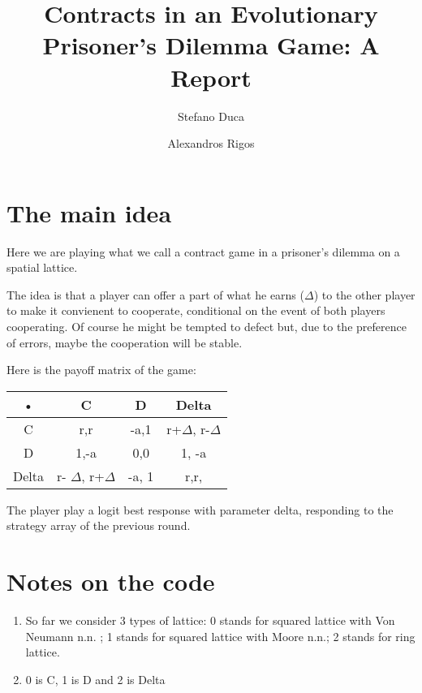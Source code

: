\documentclass{article}
\author{Stefano Duca \and Alexandros Rigos}
\title{Contracts in an Evolutionary Prisoner's Dilemma Game: A Report}
\begin{document}
\maketitle

\section{The main idea}
Here we are playing what we call a contract game in a prisoner's dilemma on a spatial lattice.

The idea is that a player can offer a part of what he earns ($\Delta$) to the other player to make it convienent to cooperate, conditional on the event of both players cooperating. Of course he might be tempted to defect but, due to the preference of errors, maybe the cooperation will be stable.

Here is the payoff matrix of the game:
\begin{center}
\begin{tabular}{|c|c|c|c|}
\hline 
• & C & D & Delta \\ 
\hline 
C & r,r & -a,1 & r+$\Delta$, r-$\Delta$ \\ 
\hline 
D & 1,-a & 0,0 & 1, -a \\ 
\hline 
Delta & r- $\Delta$, r+$\Delta$ & -a, 1 & r,r, \\ 
\hline 
\end{tabular} 
\end{center}

The player play a logit best response with parameter delta, responding to the strategy array of the previous round.

\section{Notes on the code}
\begin{enumerate}
\item  So far we consider 3 types of lattice:
0 stands for squared lattice with Von Neumann n.n. ;
1 stands for squared lattice with Moore n.n.;
2 stands for ring lattice.

\item 0 is C, 1 is D and 2 is Delta
\end{enumerate}
\end{document}
